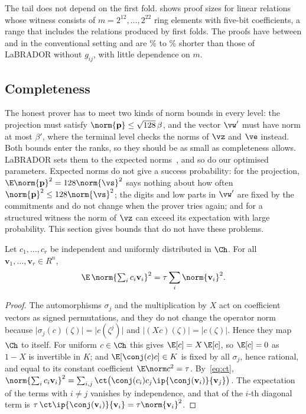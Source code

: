 The tail does not depend on the first fold.  shows proof sizes for linear relations whose witness consists of $m=2^{12},\dots,2^{22}$ ring elements with five-bit coefficients, a range that includes the relations produced by first folds. The proofs have between \nLinLo{} and \nLinHi\KB{} in the conventional setting and are \nLinPctLo\% to \nLinPctHi\% shorter than those of LaBRADOR without $g_{ij}$, with little dependence on $m$.

\subsection{Completeness}\label{sec:completeness}

The honest prover has to meet two kinds of norm bounds in every level: the projection must satisfy $\norm{\mathbf p}\le\sqrt{128}\,\beta$, and the vector $\vw'$ must have norm at most $\beta'$, where the terminal level checks the norms of $\vz$ and $\ve$ instead. Both bounds enter the ranks, so they should be as small as completeness allows. LaBRADOR sets them to the expected norms~\cite[Section~5.4]{BS23}, and so do our optimised parameters. Expected norms do not give a success probability: for the projection, $\E\norm{\mathbf p}^2=128\norm{\vs}^2$ says nothing about how often $\norm{\mathbf p}^2\le128\norm{\vs}^2$; the digits and low parts in $\vw'$ are fixed by the commitments and do not change when the prover tries again; and for a structured witness the norm of $\vz$ can exceed its expectation with large probability. This section gives bounds that do not have these problems.

\begin{lemma}\label{lem:mean}
Let $c_1,\dots,c_r$ be independent and uniformly distributed in $\Ch$. For all $\mathbf v_1,\dots,\mathbf v_r\in R^n$,
\[
\E\,\norm{\textstyle\sum_ic_i\mathbf v_i}^2=\tau\sum_i\norm{\mathbf v_i}^2 .
\]
\end{lemma}
\begin{proof}
The automorphisms $\sigma_j$ and the multiplication by $X$ act on coefficient vectors as signed permutations, and they do not change the operator norm because $\lvert\sigma_j(c)(\zeta)\rvert=\lvert c(\zeta^j)\rvert$ and $\lvert(Xc)(\zeta)\rvert=\lvert c(\zeta)\rvert$. Hence they map $\Ch$ to itself. For uniform $c\in\Ch$ this gives $\E[c]=X\,\E[c]$, so $\E[c]=0$ as $1-X$ is invertible in $K$; and $\E[\conj(c)c]\in K$ is fixed by all $\sigma_j$, hence rational, and equal to its constant coefficient $\E\norm c^2=\tau$. By~\eqref{eq:ct}, $\norm{\sum_ic_i\mathbf v_i}^2=\sum_{i,j}\ct\bigl(\conj(c_i)c_j\ip{\conj(\mathbf v_i)}{\mathbf v_j}\bigr)$. The expectation of the terms with $i\ne j$ vanishes by independence, and that of the $i$-th diagonal term is $\tau\,\ct\ip{\conj(\mathbf v_i)}{\mathbf v_i}=\tau\norm{\mathbf v_i}^2$.
\end{proof}

